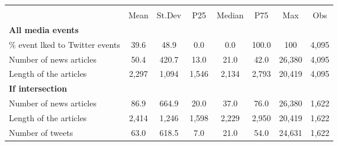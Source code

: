 {
\def\sym#1{\ifmmode^{#1}\else\(^{#1}\)\fi}
\begin{tabular}{l*{1}{ccccccc}}
\hline\hline
                    &\multicolumn{7}{c}{}                                                                      \\
                    &        Mean&      St.Dev&         P25&      Median&         P75&         Max&         Obs\\
\hline
\textbf{All media events}&            &            &            &            &            &            &            \\
\% event lked to Twitter events&        39.6&        48.9&         0.0&         0.0&       100.0&         100&       4,095\\
Number of news articles&        50.4&       420.7&        13.0&        21.0&        42.0&      26,380&       4,095\\
Length of the articles&       2,297&       1,094&       1,546&       2,134&       2,793&      20,419&       4,095\\
\textbf{If intersection}&            &            &            &            &            &            &            \\
Number of news articles&        86.9&       664.9&        20.0&        37.0&        76.0&      26,380&       1,622\\
Length of the articles&       2,414&       1,246&       1,598&       2,229&       2,950&      20,419&       1,622\\
Number of tweets    &        63.0&       618.5&         7.0&        21.0&        54.0&      24,631&       1,622\\
\hline\hline
\end{tabular}
}
